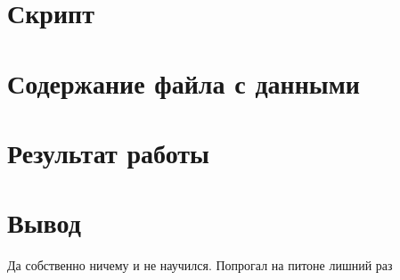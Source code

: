\documentclass[11pt]{article}
\begin{document}
\section{Скрипт}
\footnotesize
{}
\pagebreak{}
\small
\section{Содержание файла с данными}

\section{Результат работы}

\large
\section{Вывод}
Да собственно ничему и не научился. Попрогал на питоне лишний раз
\end{document}
